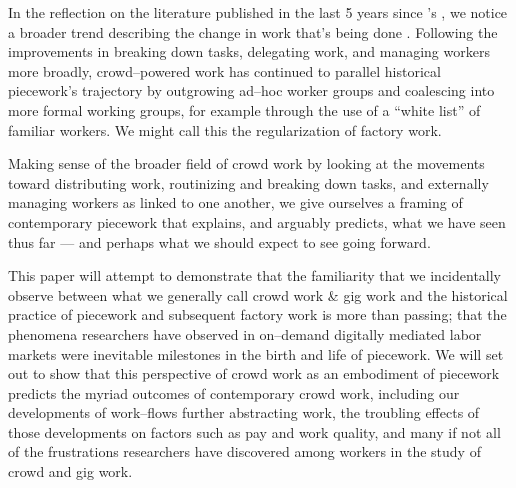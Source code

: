 \documentclass{sigchi}
\begin{document}
In the reflection on the literature published in the last 5 years since
\citeauthor{crowdworkFuture}'s 
,
we notice a broader trend describing the change in work that's being done
\cite{crowdworkFuture}.
Following the improvements in
breaking down tasks,
delegating work, and
managing workers more broadly,
crowd--powered work has continued to parallel historical piecework's trajectory
by outgrowing ad--hoc worker groups and coalescing into more formal working groups,
for example through the use of a ``white list'' of familiar workers.
We might call this the regularization of factory work.

Making sense of the broader field of crowd work
by looking at the movements toward
distributing work,
routinizing and breaking down tasks,
and externally managing workers
as linked to one another, 
we give ourselves a framing of contemporary piecework that explains,
and arguably predicts,
what we have seen thus far
--- and perhaps what we should expect to see going forward.

This paper will attempt to demonstrate that the familiarity
that we incidentally observe between what we generally call crowd work \& gig work
and the historical practice of piecework and subsequent factory work
is more than passing;
that the phenomena researchers have observed in on--demand digitally mediated labor markets
were inevitable milestones in the birth and life of piecework.
We will set out to show that this perspective of crowd work as an embodiment of piecework
predicts the myriad outcomes of contemporary crowd work, including
our developments of work--flows further abstracting work,
the troubling effects of those developments on factors such as pay and work quality, and
many if not all of the frustrations researchers have discovered among workers
in the study of crowd and gig work.
\end{document}

